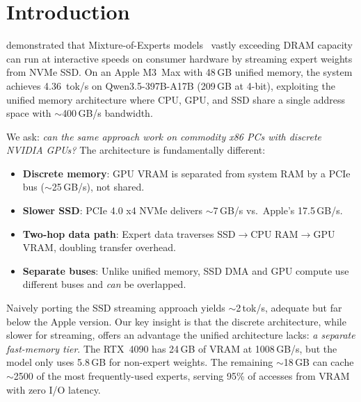 \documentclass[10pt]{article}
\begin{document}
\section{Introduction}

\citet{flashmoe} demonstrated that Mixture-of-Experts models~\citep{mixtral,deepseekv3} vastly exceeding DRAM capacity can run at interactive speeds on consumer hardware by streaming expert weights from NVMe SSD. On an Apple M3~Max with 48\,GB unified memory, the system achieves 4.36~tok/s on Qwen3.5-397B-A17B (209\,GB at 4-bit), exploiting the unified memory architecture where CPU, GPU, and SSD share a single address space with $\sim$400\,GB/s bandwidth.

We ask: \emph{can the same approach work on commodity x86 PCs with discrete NVIDIA GPUs?} The architecture is fundamentally different:

\begin{itemize}[nosep]
    \item \textbf{Discrete memory}: GPU VRAM is separated from system RAM by a PCIe bus ($\sim$25\,GB/s), not shared.
    \item \textbf{Slower SSD}: PCIe 4.0 x4 NVMe delivers $\sim$7\,GB/s vs.\ Apple's 17.5\,GB/s.
    \item \textbf{Two-hop data path}: Expert data traverses SSD$\to$CPU RAM$\to$GPU VRAM, doubling transfer overhead.
    \item \textbf{Separate buses}: Unlike unified memory, SSD DMA and GPU compute use different buses and \emph{can} be overlapped.
\end{itemize}

Naively porting the SSD streaming approach yields $\sim$2\,tok/s, adequate but far below the Apple version. Our key insight is that the discrete architecture, while slower for streaming, offers an advantage the unified architecture lacks: \emph{a separate fast-memory tier}. The RTX~4090 has 24\,GB of VRAM at 1008\,GB/s, but the model only uses 5.8\,GB for non-expert weights. The remaining $\sim$18\,GB can cache $\sim$2500 of the most frequently-used experts, serving 95\% of accesses from VRAM with zero I/O latency.
\end{document}
